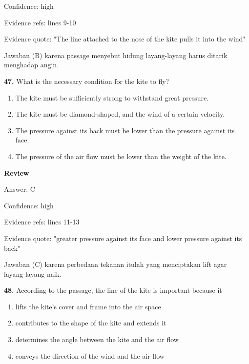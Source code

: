 \documentclass[12pt]{article}
\begin{document}
Confidence: high\par
Evidence refs: lines 9-10\par
Evidence quote: "The line attached to the nose of the kite pulls it into the wind"\par
Jawaban (B) karena passage menyebut hidung layang-layang harus ditarik menghadap angin.\par
\endgroup
\par
\vspace{0.25\baselineskip}
\noindent\textbf{47.} What is the necessary condition for the kite to fly?
\begin{enumerate}[label=(\Alph*),leftmargin=*,itemsep=0.2em]
\item The kite must be sufficiently strong to withstand great pressure.
\item The kite must be diamond-shaped, and the wind of a certain velocity.
\item The pressure against its back must be lower than the pressure against its face.
\item The pressure of the air flow must be lower than the weight of the kite.
\end{enumerate}
\par
\begingroup
\setlength{\parskip}{0pt}
\setlength{\parindent}{0pt}
\textbf{Review}\par
Answer: C\par
Confidence: high\par
Evidence refs: lines 11-13\par
Evidence quote: "greater pressure against its face and lower pressure against its back"\par
Jawaban (C) karena perbedaan tekanan itulah yang menciptakan lift agar layang-layang naik.\par
\endgroup
\par
\vspace{0.25\baselineskip}
\noindent\textbf{48.} According to the passage, the line of the kite is important because it
\begin{enumerate}[label=(\Alph*),leftmargin=*,itemsep=0.2em]
\item lifts the kite's cover and frame into the air space
\item contributes to the shape of the kite and extends it
\item determines the angle between the kite and the air flow
\item conveys the direction of the wind and the air flow
\end{enumerate}
\end{document}
